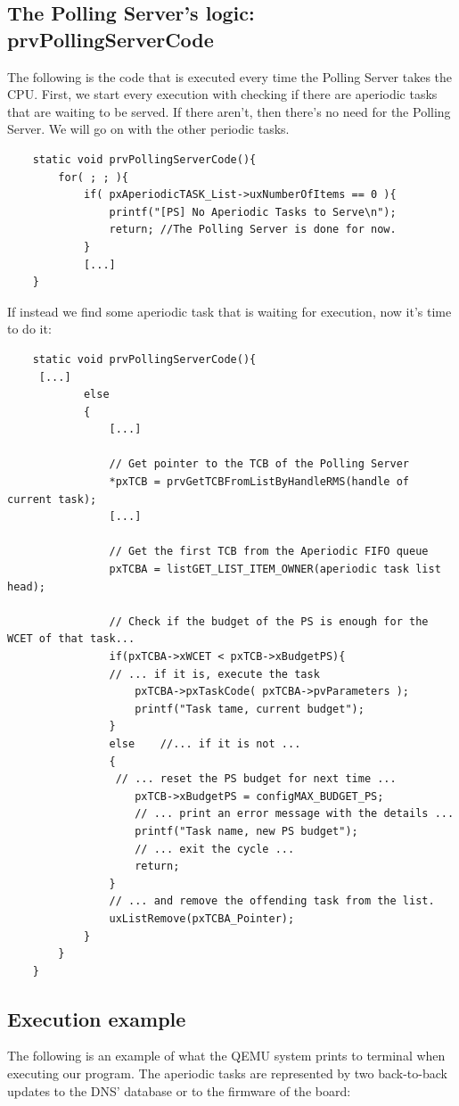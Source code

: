 \documentclass[10pt]{article}
\begin{document}
\subsection{The Polling Server's logic: prvPollingServerCode}
The following is the code that is executed every time the Polling Server takes the CPU.
First, we start every execution with checking if there are aperiodic tasks that are waiting to be served. If there aren't, then there's no need for the Polling Server. We will go on with the other periodic tasks.
\begin{lstlisting}
    static void prvPollingServerCode(){
        for( ; ; ){
            if( pxAperiodicTASK_List->uxNumberOfItems == 0 ){
                printf("[PS] No Aperiodic Tasks to Serve\n");
                return; //The Polling Server is done for now.
            }
            [...]
    }
\end{lstlisting}
If instead we find some aperiodic task that is waiting for execution, now it's time to do it:
\begin{lstlisting}
    static void prvPollingServerCode(){
     [...]
            else
            { 
                [...]

                // Get pointer to the TCB of the Polling Server
                *pxTCB = prvGetTCBFromListByHandleRMS(handle of current task);
                [...]

                // Get the first TCB from the Aperiodic FIFO queue
                pxTCBA = listGET_LIST_ITEM_OWNER(aperiodic task list head);

                // Check if the budget of the PS is enough for the WCET of that task...
                if(pxTCBA->xWCET < pxTCB->xBudgetPS){
                // ... if it is, execute the task
                    pxTCBA->pxTaskCode( pxTCBA->pvParameters );
                    printf("Task tame, current budget");
                }
                else    //... if it is not ...
                {
                 // ... reset the PS budget for next time ...
                    pxTCB->xBudgetPS = configMAX_BUDGET_PS;
                    // ... print an error message with the details ...
                    printf("Task name, new PS budget");
             		// ... exit the cycle ...
                    return;
                }
                // ... and remove the offending task from the list.
                uxListRemove(pxTCBA_Pointer);
            }
        }
    }
\end{lstlisting}
\subsection{Execution example}
The following is an example of what the QEMU system prints to terminal when executing our program. The aperiodic tasks are represented by two back-to-back updates to the DNS' database or to the firmware of the board:
\end{document}
